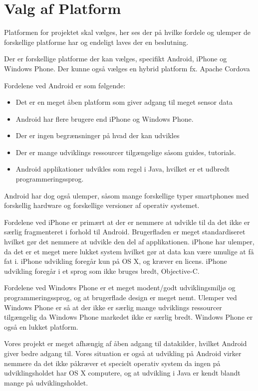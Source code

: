 \section{Valg af Platform}\label{sec:valg_af_android}
Platformen for projektet skal vælges, her ses der på hvilke fordele og ulemper de forskellige platforme har og endeligt laves der en beslutning.

Der er forskellige platforme der kan vælges, specifikt Android, iPhone og Windows Phone.
Der kunne også vælges en hybrid platform fx. Apache Cordova \citep{misc:apachecordova}

Fordelene ved Android er som følgende:
\begin{itemize}
\item Det er en meget åben platform som giver adgang til meget sensor data
\item Android har flere brugere end iPhone og Windows Phone.
\item Der er ingen begrænsninger på hvad der kan udvikles
\item Der er mange udviklings ressourcer tilgængelige såsom guides, tutorials.
\item Android applikationer udvikles som regel i Java, hvilket er et udbredt programmeringssprog.
\end{itemize}

Android har dog også ulemper, såsom mange forskellige typer smartphones med forskellig hardware og forskellige versioner af operativ systemet.

Fordelene ved iPhone er primært at der er nemmere at udvikle til da det ikke er særlig fragmenteret i forhold til Android. 
Brugerfladen er meget standardiseret hvilket gør det nemmere at udvikle den del af applikationen. 
iPhone har ulemper, da det er et meget mere lukket system hvilket gør at data kan være umulige at få fat i. iPhone udvikling foregår kun på OS X, og kræver en licens. iPhone udvikling foregår i et sprog som ikke bruges bredt, Objective-C.

Fordelene ved Windows Phone er et meget modent/godt udviklingsmiljø og programmeringssprog, og at brugerflade design er meget nemt. 
Ulemper ved Windows Phone er så at der ikke er særlig mange udviklings ressourcer tilgængelig da Windows Phone markedet ikke er særlig bredt. Windows Phone er også en lukket platform.

Vores projekt er meget afhængig af åben adgang til datakilder, hvilket Android giver bedre adgang til. Vores situation er også at udvikling på Android virker nemmere da det ikke påkræver et specielt operativ system da ingen på udviklingsholdet har OS X computere, og at udvikling i Java er kendt blandt mange på udviklingsholdet.

